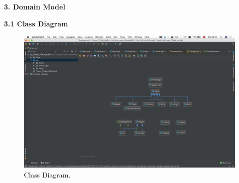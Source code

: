 \documentclass{article}
\begin{document}
\begin{flushleft}
\vspace{10mm}

\newpage
\begin{Large}\textbf{3.	Domain Model}\\	
\end{Large}
\vspace{3mm}
\textbf{3.1	Class Diagram}

\begin{figure}[h]
	\includegraphics*[scale=0.30]{Class-diagram}
	\caption{Class Diagram.}	
\end{figure}
	
\end{flushleft}
\end{document}
